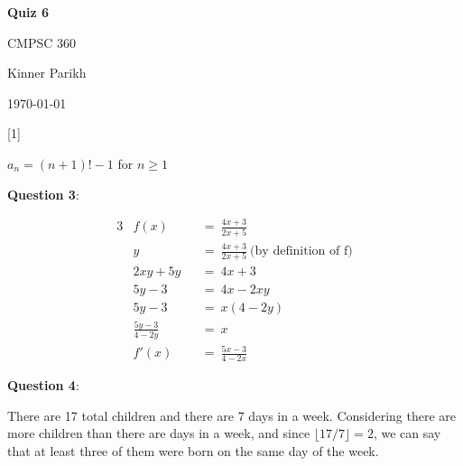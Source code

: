 \documentclass{article} %
\newcommand{\question}[2][]{\begin{flushleft}
        \textbf{Question #1}: \textit{#2}

\end{flushleft}}
\newcommand{\maketitletwo}[2][]{\begin{center}
        \Large{\textbf{Quiz #1}
            
            CMPSC 360} %
        \vspace{5pt}
        
        \normalsize{Kinner Parikh  %
        
        \today}        %
        \vspace{15pt}
        
\end{center}}
\begin{document}
    \maketitletwo[6]  %
    
    \question[1]{}

    $a_n = (n + 1)! - 1$ for $n \geq 1$

    \question[3]{}

    \begin{alignat*}{3}
        & f(x)        &&=\ \frac{4x+3}{2x+5} \\
        & y           &&=\ \frac{4x+3}{2x+5} \ \text{(by definition of f)} \\
        & 2xy +5y     &&=\ 4x + 3 \\
        & 5y - 3      &&=\ 4x-2xy \\
        & 5y - 3      &&=\ x(4-2y) \\
        & \frac{5y - 3}{4-2y} &&=\ x \\
        & f'(x) &&=\ \frac{5x - 3}{4-2x}
    \end{alignat*}

    \question[4]{}

    There are 17 total children and there are 7 days in a week. Considering there are more children than there are days in a week, and since $\lfloor 17/7 \rfloor = 2$, we can say that at least three of them were born on the same day of the week.
    
\end{document}
